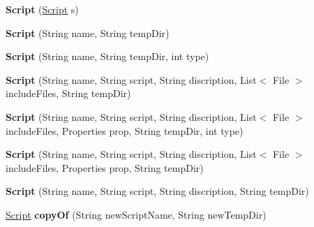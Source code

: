 \begin{DoxyCompactItemize}
\item 
\hypertarget{classCASUAL_1_1caspac_1_1Script_a817dc05b31f3530869f8ef2c5b9bc2b2}{{\bfseries Script} (\hyperlink{classCASUAL_1_1caspac_1_1Script}{Script} s)}\label{classCASUAL_1_1caspac_1_1Script_a817dc05b31f3530869f8ef2c5b9bc2b2}

\item 
\hypertarget{classCASUAL_1_1caspac_1_1Script_aa2c99871b0dad53e547497fd030a995f}{{\bfseries Script} (String name, String temp\-Dir)}\label{classCASUAL_1_1caspac_1_1Script_aa2c99871b0dad53e547497fd030a995f}

\item 
\hypertarget{classCASUAL_1_1caspac_1_1Script_ad1dadc2cf2ae9ff6f0dbcab2d7683076}{{\bfseries Script} (String name, String temp\-Dir, int type)}\label{classCASUAL_1_1caspac_1_1Script_ad1dadc2cf2ae9ff6f0dbcab2d7683076}

\item 
\hypertarget{classCASUAL_1_1caspac_1_1Script_acf090cbcc44153ce1b981630408849c7}{{\bfseries Script} (String name, String script, String discription, List$<$ File $>$ include\-Files, String temp\-Dir)}\label{classCASUAL_1_1caspac_1_1Script_acf090cbcc44153ce1b981630408849c7}

\item 
\hypertarget{classCASUAL_1_1caspac_1_1Script_ab116bbfc07a8bf5350c5a80b0cb2ec90}{{\bfseries Script} (String name, String script, String discription, List$<$ File $>$ include\-Files, Properties prop, String temp\-Dir, int type)}\label{classCASUAL_1_1caspac_1_1Script_ab116bbfc07a8bf5350c5a80b0cb2ec90}

\item 
\hypertarget{classCASUAL_1_1caspac_1_1Script_a9f76bf636c370bc47a78d42aa7b1bd6e}{{\bfseries Script} (String name, String script, String discription, List$<$ File $>$ include\-Files, Properties prop, String temp\-Dir)}\label{classCASUAL_1_1caspac_1_1Script_a9f76bf636c370bc47a78d42aa7b1bd6e}

\item 
\hypertarget{classCASUAL_1_1caspac_1_1Script_a6c9c44092063b31f1b5fa30b323e2c21}{{\bfseries Script} (String name, String script, String discription, String temp\-Dir)}\label{classCASUAL_1_1caspac_1_1Script_a6c9c44092063b31f1b5fa30b323e2c21}

\item 
\hypertarget{classCASUAL_1_1caspac_1_1Script_ae19c81a3460603a10818522d801e43ca}{\hyperlink{classCASUAL_1_1caspac_1_1Script}{Script} {\bfseries copy\-Of} (String new\-Script\-Name, String new\-Temp\-Dir)}\label{classCASUAL_1_1caspac_1_1Script_ae19c81a3460603a10818522d801e43ca}


\end{DoxyCompactItemize}

